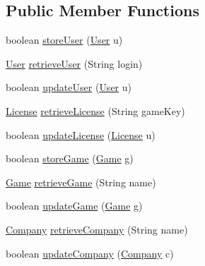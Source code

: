 \subsection*{Public Member Functions}
\begin{DoxyCompactItemize}
\item 
boolean \hyperlink{interfacees_1_1deusto_1_1server_1_1db_1_1dao_1_1_i_d_a_o_ab943216560f43595a852b406dcd394a4}{store\+User} (\hyperlink{classes_1_1deusto_1_1server_1_1db_1_1data_1_1_user}{User} u)
\item 
\hyperlink{classes_1_1deusto_1_1server_1_1db_1_1data_1_1_user}{User} \hyperlink{interfacees_1_1deusto_1_1server_1_1db_1_1dao_1_1_i_d_a_o_a19f9b0d0b6f5f80730d6d197deca7dfc}{retrieve\+User} (String login)
\item 
boolean \hyperlink{interfacees_1_1deusto_1_1server_1_1db_1_1dao_1_1_i_d_a_o_a790b00e2989b634c1bbb2c6620ff3583}{update\+User} (\hyperlink{classes_1_1deusto_1_1server_1_1db_1_1data_1_1_user}{User} u)
\item 
\hyperlink{classes_1_1deusto_1_1server_1_1db_1_1data_1_1_license}{License} \hyperlink{interfacees_1_1deusto_1_1server_1_1db_1_1dao_1_1_i_d_a_o_a6a3e25055d4a81c738d1bd73de6ef7da}{retrieve\+License} (String game\+Key)
\item 
boolean \hyperlink{interfacees_1_1deusto_1_1server_1_1db_1_1dao_1_1_i_d_a_o_a601329b95123948b10c3232687b11d5b}{update\+License} (\hyperlink{classes_1_1deusto_1_1server_1_1db_1_1data_1_1_license}{License} u)
\item 
boolean \hyperlink{interfacees_1_1deusto_1_1server_1_1db_1_1dao_1_1_i_d_a_o_ab38972c7c70c95b4c409fa7758ef2fc3}{store\+Game} (\hyperlink{classes_1_1deusto_1_1server_1_1db_1_1data_1_1_game}{Game} g)
\item 
\hyperlink{classes_1_1deusto_1_1server_1_1db_1_1data_1_1_game}{Game} \hyperlink{interfacees_1_1deusto_1_1server_1_1db_1_1dao_1_1_i_d_a_o_a30558c19c086ac0ffff6796a8ae208fb}{retrieve\+Game} (String name)
\item 
boolean \hyperlink{interfacees_1_1deusto_1_1server_1_1db_1_1dao_1_1_i_d_a_o_a3a3ca0456879e35349a937aac661ff3f}{update\+Game} (\hyperlink{classes_1_1deusto_1_1server_1_1db_1_1data_1_1_game}{Game} g)
\item 
\hyperlink{classes_1_1deusto_1_1server_1_1db_1_1data_1_1_company}{Company} \hyperlink{interfacees_1_1deusto_1_1server_1_1db_1_1dao_1_1_i_d_a_o_ad6fd7873e2191e887184e2261e34e3e5}{retrieve\+Company} (String name)
\item 
boolean \hyperlink{interfacees_1_1deusto_1_1server_1_1db_1_1dao_1_1_i_d_a_o_a2d4302c61abd557f5a84d0698afdb814}{update\+Company} (\hyperlink{classes_1_1deusto_1_1server_1_1db_1_1data_1_1_company}{Company} c)

\end{DoxyCompactItemize}
